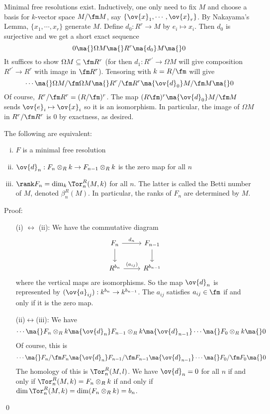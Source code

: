 \begin{rem}
Minimal free resolutions exist. Inductively, one only need to fix $M$ and choose a basis for $k$-vector space $M/\fm M$, say $\{\ov{x}_1,\cdots,\ov{x}_r\}$. By Nakayama's Lemma, $\{x_1,\cdots,x_r\}$ generate $M$. Define $d_0: R^r \to M$ by $e_i \mapsto x_i$. Then $d_0$ is surjective and we get a short exact sequence
\[
0 \ma{} \Omega M \ma{} R^r \ma{d_0} M \ma{} 0
\]
It suffices to show $\Omega M \subseteq \fm R^r$ (for then $d_1: R^{r'} \to \Omega M$ will give composition $R^{r'} \to R^r$ with image in $\fm R^r$). Tensoring with $k=R/\fm$ will give
\[
\cdots \ma{} \Omega M/\fm \Omega M \ma{} R^r/\fm R^r \ma{\ov{d}_0} M/\fm M \ma{} 0
\]
Of course, $R^r/\fm R^r =(R/\fm)^r$. The map $(R\fm)^r \ma{\ov{d}_0} M/\fm M$ sends $\ov{e}_i \mapsto \ov{x}_i$ so it is an isomorphism. In particular, the image of $\Omega M$ in $R^r/\fm R^r$ is 0 by exactness, as desired. 
\end{rem}

\begin{prop}
The following are equivalent:
\begin{enumerate}[(i)]
\item $F$ is a minimal free resolution
\item $\ov{d}_n: F_n \otimes_R k \to F_{n-1} \otimes_R k$ is the zero map for all $n$
\item $\rank F_n=\dim_k \Tor_n^R(M,k)$ for all $n$. The latter is called the Betti number of $M$, denoted $\beta_n^R(M)$. In particular, the ranks of $F_n$ are determined by $M$.
\end{enumerate}
\end{prop}

\noindent Proof:
\begin{enumerate}
\item[(i) $\leftrightarrow$ (ii):]  We have the commutative diagram
\[
\begin{tikzcd}
F_n \arrow{r}{d_n} \arrow{d} & F_{n-1} \arrow{d} \\
R^{b_n} \arrow{r}{(a_{ij})} & R^{b_{n-1}}
\end{tikzcd}
\]
where the vertical maps are isomorphisms. So the map $\ov{d}_n$ is represented by $(\ov{a}_{ij}): k^{b_n} \to k^{b_{n-1}}$. The $a_{ij}$ satisfies $a_{ij} \in \fm$ if and only if it is the zero map. 

\item[(ii)$\leftrightarrow$(iii):] We have 
\[
\cdots \ma{} F_n \otimes_R k \ma{\ov{d}_n} F_{n-1} \otimes_R k \ma{\ov{d}_{n-1}} \cdots \ma{} F_0 \otimes_R k \ma{} 0
\]
Of course, this is
\[
\cdots \ma{} F_n/\fm F_n \ma{\ov{d}_n} F_{n-1}/\fm F_{n-1} \ma{\ov{d}_{n-1}} \cdots \ma{} F_0/\fm F_0 \ma{} 0
\]
The homology of this is $\Tor_n^R(M,l)$. We have $\ov{d}_n=0$ for all $n$ if and only if $\Tor_n^R(M,k)=F_n \otimes_R k$ if and only if $\dim\Tor_n^R(M,k)=\dim(F_n \otimes_R k)=b_n$. 
\end{enumerate}
\qed \\

